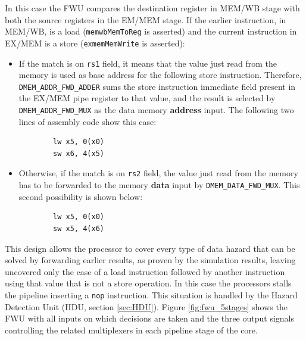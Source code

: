 \documentclass[a4paper]{article}
\begin{document}
In this case the FWU compares the destination register in MEM/WB stage with both the source registers in the EM/MEM stage. If the earlier instruction, in MEM/WB, is a load (\texttt{memwbMemToReg} is asserted) and the current instruction in EX/MEM is a store (\texttt{exmemMemWrite} is asserted):
\begin{itemize}
    \item If the match is on \texttt{rs1} field, it means that the value just read from the memory is used as base address for the following store instruction. Therefore, \texttt{DMEM\_ADDR\_FWD\_ADDER} sums the store instruction immediate field present in the EX/MEM pipe register to that value, and the result is selected by \texttt{DMEM\_ADDR\_FWD\_MUX} as the data memory \textbf{address} input. The following two lines of assembly code show this case:
    \begin{lstlisting}
        lw x5, 0(x0)
        sw x6, 4(x5)
    \end{lstlisting}
    \item Otherwise, if the match is on \texttt{rs2} field, the value just read from the memory has to be forwarded to the memory \textbf{data} input by \texttt{DMEM\_DATA\_FWD\_MUX}. This second possibility is shown below:
    \begin{lstlisting}
        lw x5, 0(x0)
        sw x5, 4(x6)
    \end{lstlisting}
\end{itemize}

This design allows the processor to cover every type of data hazard that can be solved by forwarding earlier results, as proven by the simulation results, leaving uncovered only the case of a load instruction followed by another instruction using that value that is not a store operation. In this case the processors stalls the pipeline inserting a \texttt{nop} instruction. This situation is handled by the Hazard Detection Unit (HDU, section \ref{sec:HDU}).
Figure \ref{fig:fwu_5stages} shows the FWU with all inputs on which decisions are taken and the three output signals controlling the related multiplexers in each pipeline stage of the core.
\end{document}
